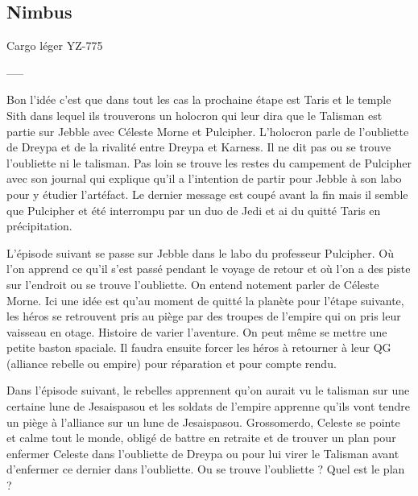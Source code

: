 \subsection{Nimbus} \label{sec:nimbus}
Cargo léger YZ-775

-----


Bon l'idée c'est que dans tout les cas la prochaine étape est Taris et le temple Sith dans lequel ils trouverons un holocron qui leur dira que le Talisman est partie sur Jebble avec Céleste Morne et Pulcipher.
L'holocron parle de l'oubliette de Dreypa et de la rivalité entre Dreypa et Karness. Il ne dit pas ou se trouve l'oubliette ni le talisman. 
Pas loin se trouve les restes du campement de Pulcipher avec son journal qui explique qu'il a l'intention de partir pour Jebble à son labo pour y étudier l'artéfact. Le dernier message est coupé avant la fin mais il semble que Pulcipher et été interrompu par un duo de Jedi et ai du quitté Taris en précipitation.


L'épisode suivant se passe sur Jebble dans le labo du professeur Pulcipher. Où l'on apprend ce qu'il s'est passé pendant le voyage de retour et où l'on a des piste sur l'endroit ou se trouve l'oubliette. On entend notement parler de Céleste Morne.
Ici une idée est qu'au moment de quitté la planète pour l'étape suivante, les héros se retrouvent pris au piège par des troupes de l'empire qui on pris leur vaisseau en otage. Histoire de varier l'aventure. On peut même se mettre une petite baston spaciale.
Il faudra ensuite forcer les héros à retourner à leur QG (alliance rebelle ou empire) pour réparation et pour compte rendu.

Dans l'épisode suivant, le rebelles apprennent qu'on aurait vu le talisman sur une certaine lune de Jesaispasou et les soldats de l'empire apprenne qu'ils vont tendre un piège à l'alliance sur un lune de Jesaispasou.
Grossomerdo, Celeste se pointe et calme tout le monde, obligé de battre en retraite et de trouver un plan pour enfermer Celeste dans l'oubliette de Dreypa ou pour lui virer le Talisman avant d'enfermer ce dernier dans l'oubliette. Ou se trouve l'oubliette ? Quel est le plan ?